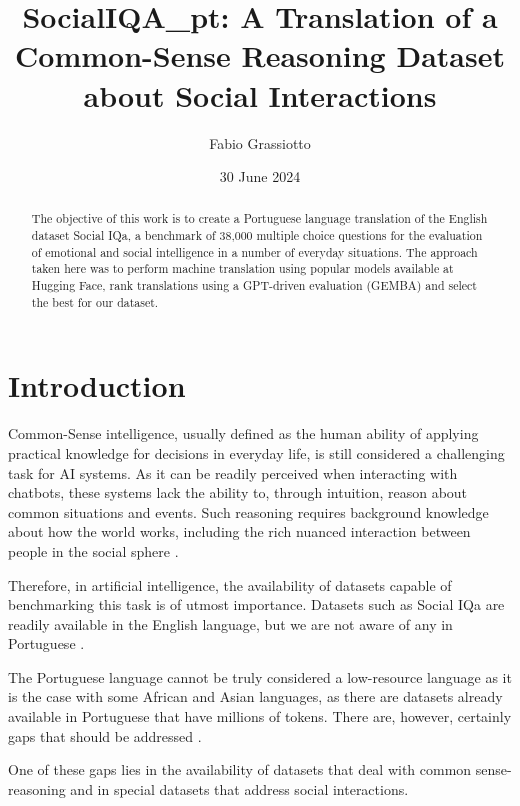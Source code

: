 \documentclass{article}
\title{SocialIQA\_pt: A Translation of a Common-Sense Reasoning Dataset about Social Interactions}
\author{Fabio Grassiotto}
\date{30 June 2024}
\begin{document}
\maketitle

\begin{abstract}
    The objective of this work is to create a Portuguese language translation of
    the English dataset Social IQa, a benchmark of 38,000 multiple choice
    questions for the evaluation of emotional and social intelligence in a
    number of everyday situations. The approach taken here was to perform
    machine translation using popular models available at Hugging Face, rank
    translations using a GPT-driven evaluation (GEMBA) and select the best for
    our dataset.
\end{abstract}

\section{Introduction} 

Common-Sense intelligence, usually defined as the human ability of applying
practical knowledge for decisions in everyday life, is still considered a
challenging task for AI systems. As it can be readily perceived when interacting
with chatbots, these systems lack the ability to, through intuition, reason
about common situations and events. Such reasoning requires background knowledge
about how the world works, including the rich nuanced interaction between people
in the social sphere \cite{choi2022curious, krause2023commonsense}.

Therefore, in artificial intelligence, the availability of datasets capable of
benchmarking this task is of utmost importance. Datasets such as Social IQa are
readily available in the English language, but we are not aware of any in
Portuguese \cite{sap2019socialiqa}.

The Portuguese language cannot be truly considered a low-resource language as
it is the case with some African and Asian languages, as there are
datasets already available in Portuguese that have millions of tokens. There
are, however, certainly gaps that should be addressed \cite{ghafoor2021impact}.

One of these gaps lies in the availability of datasets that deal with common
sense-reasoning and in special datasets that address social interactions.
\end{document}
